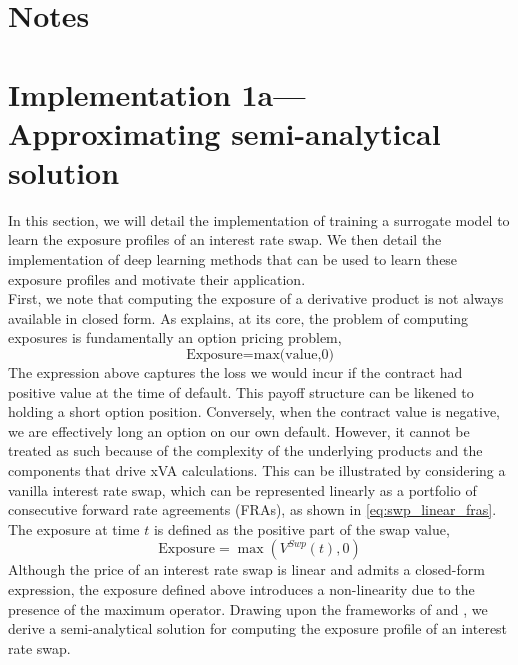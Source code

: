 \section{Notes}

\section{Implementation 1a—Approximating semi-analytical solution}\label{sec:model1a}
    In this section, we will detail the implementation of training a surrogate model to learn the exposure profiles of an interest rate swap. We then detail the implementation of deep learning methods that can be used to learn these exposure profiles and motivate their application. \\

    \noindent
    First, we note that computing the exposure of a derivative product is not always available in closed form. As \cite{Gregory_2015} explains, at its core, the problem of computing exposures is fundamentally an option pricing problem,  
    \begin{equation}
        \text{Exposure} = \text{max(value,0)}
    \end{equation}
    The expression above captures the loss we would incur if the contract had positive value at the time of default. This payoff structure can be likened to holding a short option position. Conversely, when the contract value is negative, we are effectively long an option on our own default. However, it cannot be treated as such because of the complexity of the underlying products and the components that drive xVA calculations. This can be illustrated by considering a vanilla interest rate swap, which can be represented linearly as a portfolio of consecutive forward rate agreements (FRAs), as shown in \ref{eq:swp_linear_fras}. The exposure at time $t$ is defined as the positive part of the swap value,
    \begin{equation}
        \text{Exposure} = \max(V^{Swp}(t),0)
    \end{equation}
    Although the price of an interest rate swap is linear and admits a closed-form expression, the exposure defined above introduces a non-linearity due to the presence of the maximum operator.
    Drawing upon the frameworks of \cite{sorensen1994pricing} and \cite{jamshidian1989exact}, we derive a semi-analytical solution for computing the exposure profile of an interest rate swap.  \\
    
